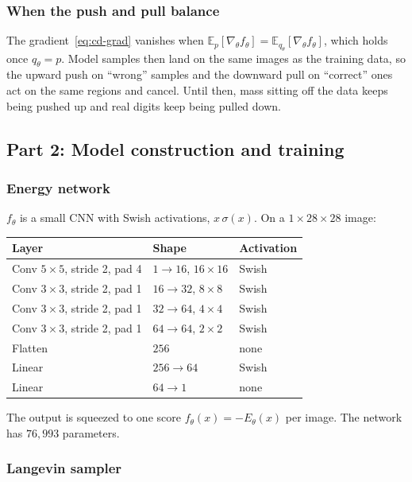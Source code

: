 \subsubsection{When the push and pull balance}

The gradient~\eqref{eq:cd-grad} vanishes when \(\mathbb{E}_{p}[\nabla_\theta f_\theta] = \mathbb{E}_{q_\theta}[\nabla_\theta f_\theta]\), which holds once \(q_\theta = p\). Model samples then land on the same images as the training data, so the upward push on ``wrong'' samples and the downward pull on ``correct'' ones act on the same regions and cancel. Until then, mass sitting off the data keeps being pushed up and real digits keep being pulled down.

\subsection{Part 2: Model construction and training}

\subsubsection{Energy network}

\(f_\theta\) is a small CNN with Swish activations, \(x\,\sigma(x)\). On a \(1\times 28\times 28\) image:
\begin{center}
\begin{tabular}{lll}
\toprule
Layer & Shape & Activation \\
\midrule
Conv \(5\times 5\), stride 2, pad 4 & \(1 \to 16\), \(16\times 16\) & Swish \\
Conv \(3\times 3\), stride 2, pad 1 & \(16 \to 32\), \(8\times 8\) & Swish \\
Conv \(3\times 3\), stride 2, pad 1 & \(32 \to 64\), \(4\times 4\) & Swish \\
Conv \(3\times 3\), stride 2, pad 1 & \(64 \to 64\), \(2\times 2\) & Swish \\
Flatten & \(256\) & none \\
Linear & \(256 \to 64\) & Swish \\
Linear & \(64 \to 1\) & none \\
\bottomrule
\end{tabular}
\end{center}
The output is squeezed to one score \(f_\theta(x) = -E_\theta(x)\) per image. The network has \(76{,}993\) parameters.

\subsubsection{Langevin sampler}

